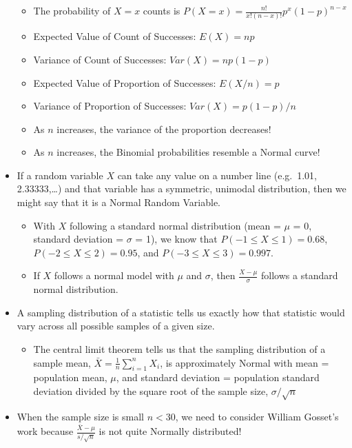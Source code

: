 \documentclass[
]{book}
\providecommand{\tightlist}{%
  \setlength{\itemsep}{0pt}\setlength{\parskip}{0pt}}
\begin{document}
\begin{itemize}
  \begin{itemize}
  \tightlist
  \item
    The probability of \(X = x\) counts is \(P(X = x) = \frac{n!}{x!(n-x)!} p^x(1-p)^{n-x}\)
  \item
    Expected Value of Count of Successes: \(E(X) = np\)
  \item
    Variance of Count of Successes: \(Var(X) = np(1-p)\)
  \item
    Expected Value of Proportion of Successes: \(E(X/n) = p\)
  \item
    Variance of Proportion of Successes: \(Var(X) = p(1-p)/n\)
  \item
    As \(n\) increases, the variance of the proportion decreases!
  \item
    As \(n\) increases, the Binomial probabilities resemble a Normal curve!
  \end{itemize}
\item
  If a random variable \(X\) can take any value on a number line (e.g.~1.01, 2.33333,\ldots) and that variable has a symmetric, unimodal distribution, then we might say that it is a Normal Random Variable.

  \begin{itemize}
  \tightlist
  \item
    With \(X\) following a standard normal distribution (mean = \(\mu\) = 0, standard deviation = \(\sigma\) = 1), we know that \(P(-1\leq X \leq 1) = 0.68\), \(P(-2\leq X \leq 2) = 0.95\), and \(P(-3\leq X \leq 3) = 0.997\).
  \item
    If \(X\) follows a normal model with \(\mu\) and \(\sigma\), then \(\frac{X-\mu}{\sigma}\) follows a standard normal distribution.
  \end{itemize}
\item
  A sampling distribution of a statistic tells us exactly how that statistic would vary across all possible samples of a given size.

  \begin{itemize}
  \tightlist
  \item
    The central limit theorem tells us that the sampling distribution of a sample mean, \(\bar{X} = \frac{1}{n}\sum_{i=1}^n X_i\), is approximately Normal with mean = population mean, \(\mu\), and standard deviation = population standard deviation divided by the square root of the sample size, \(\sigma/\sqrt{n}\)
  \end{itemize}
\item
  When the sample size is small \(n<30\), we need to consider William Gosset's work because \(\frac{\bar{X} - \mu}{s/\sqrt{n}}\) is not quite Normally distributed!
\end{itemize}
\end{document}
